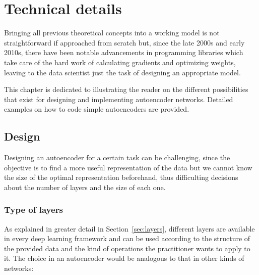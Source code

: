 \setchapterpreamble[u]{\margintoc}
\chapter{Technical details}

Bringing all previous theoretical concepts into a working model is not straightforward if approached from scratch but, since the late 2000s and early 2010s, there have been notable advancements in programming libraries which take care of the hard work of calculating gradients and optimizing weights, leaving to the data scientist just the task of designing an appropriate model.

This chapter is dedicated to illustrating the reader on the different possibilities that exist for designing and implementing autoencoder networks. Detailed examples on how to code simple autoencoders are provided.

\section{Design}\label{sec:design}

Designing an autoencoder for a certain task can be challenging, since the objective is to find a more useful representation of the data but we cannot know the size of the optimal representation beforehand, thus difficulting decisions about the number of layers and the size of each one.

\subsection{Type of layers}

As explained in greater detail in Section~\ref{sec:layers}, different layers are available in every deep learning framework and can be used according to the structure of the provided data and the kind of operations the practitioner wants to apply to it. The choice in an autoencoder would be analogous to that in other kinds of networks:

